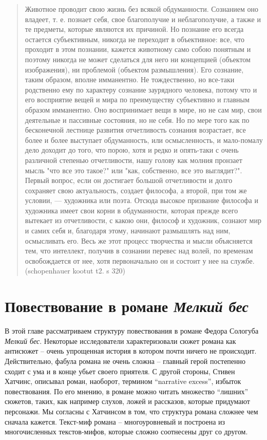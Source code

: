 \documentclass[12pt,a4paper]{article}
\begin{document}
\begin{quote}
Животное проводит свою жизнь без всякой обдуманности. Сознанием оно
владеет, т. е. познает себя, свое благополучие и неблагополучие, а также
и те предметы, которые являются их причиной. Но познание его всегда
остается субъективным, никогда не переходит в объективное: все, что
проходит в этом познании, кажется животному само собою понятным
и поэтому никогда не может сделаться для него ни концепцией (объектом
изображения), ни проблемой (объектом размышления). Его сознание,
таким образом, вполне имманентно. Не тождественно, но все-таки
родственно ему по характеру сознание заурядного человека, потому что и его
восприятие вещей и мира по преимуществу субъективно и главным
образом имманентно. Оно воспринимает вещи в мире, но не сам мир, свои
деятельные и пассивные состояния, но не себя. Но по мере того как по
бесконечной лестнице развития отчетливость сознания возрастает, все
более и более выступает обдуманность, или осмысленность, и
мало-помалу дело доходит до того, что порою, хотя и редко и опять-таки
с очень различной степенью отчетливости, нашу голову как молния
пронзает мысль "что все это такое?" или "как, собственно, все это
выглядит?". Первый вопрос, если он достигает большой отчетливости
и долго сохраняет свою актуальность, создает философа, а второй, при
том же условии, — художника или поэта. Отсюда высокое призвание
философа и художника имеет свои корни в обдуманности, которая прежде
всего вытекает из отчетливости, с какою они, философ и художник,
сознают мир и самих себя и, благодаря этому, начинают размышлять над
ним, осмысливать его. Весь же этот процесс творчества и мысли
объясняется тем, что интеллект, получив в сознании перевес над волей, по временам
освобождается от нее, хотя первоначально он и состоит у нее на службе.
(schopenhauer kootut t2. s 320)
\end{quote}

\section{Повествование в романе \textit{Мелкий бес}}

В этой главе рассматриваем структуру повествования в романе Федора Сологуба \emph{Мелкий бес}. Некоторые исследователи характеризовали сюжет романа как антисюжет -- очень упрощенная история в котором почти ничего не происходит. Действительно, фабула романа не очень сложна -- главный герой постепенно сходит с ума и в конце убьет своего приятеля. С другой стороны, Стивен Хатчинс, описывал роман, наоборот, термином \enquote{narrative excess}, избыток повествования. По его мнению, в романе можно читать множество \enquote{лишних} сюжетов, таких, как например слухов, ложей и рассказов, которые придумают персонажи. \parencite[111--114.]{hutchings1997} Мы согласны с Хатчинсом в том, что структура романа сложнее чем сначала кажется. Текст-миф романа – многоуровневый и построена из многочисленных текстов-мифов, которые сложно соотнесены друг со другом.
\end{document}
